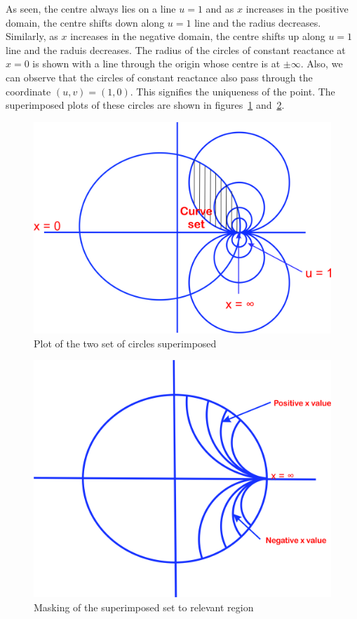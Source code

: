As seen, the centre always lies on a line $u = 1$ and as $x$ increases in the positive domain, the centre shifts down along $u = 1$ line and the radius decreases. Similarly, as $x$ increases in the negative domain, the centre shifts up along $u = 1$ line and the raduis decreases. The radius of the circles of constant reactance at $x = 0$ is shown with a line through the origin whose centre is at $\pm\infty$. Also, we can observe that the circles of constant reactance also pass through the coordinate $(u,v) = (1,0)$. This signifies the uniqueness of the point. The superimposed plots of these circles are shown in figures~\ref{fig:ijnbvcxw} and~\ref{fig:sddfghj}.
\begin{figure}[h]
\centering
\includegraphics[width=0.7\linewidth]{./graphics/ijnbvcxw}
\caption{Plot of the two set of circles superimposed}
\label{fig:ijnbvcxw}
\end{figure}
\begin{figure}[h]
\centering
\includegraphics[width=0.7\linewidth]{./graphics/sddfghj}
\caption{Masking of the superimposed set to relevant region}
\label{fig:sddfghj}
\end{figure}

